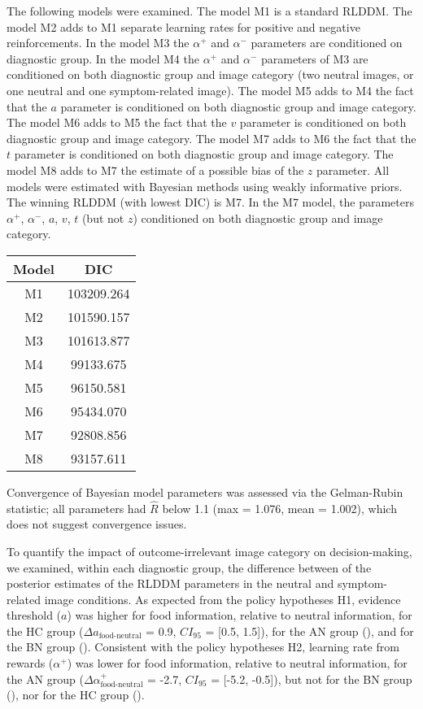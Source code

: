 \documentclass[
  man,floatsintext]{apa6}
\begin{document}
The following models were examined. The model M1 is a standard RLDDM. The model M2 adds to M1 separate learning rates for positive and negative reinforcements. In the model M3 the \(\alpha^+\) and \(\alpha^-\) parameters are conditioned on diagnostic group. In the model M4 the \(\alpha^+\) and \(\alpha^-\) parameters of M3 are conditioned on both diagnostic group and image category (two neutral images, or one neutral and one symptom-related image). The model M5 adds to M4 the fact that the \(a\) parameter is conditioned on both diagnostic group and image category. The model M6 adds to M5 the fact that the \(v\) parameter is conditioned on both diagnostic group and image category. The model M7 adds to M6 the fact that the \(t\) parameter is conditioned on both diagnostic group and image category. The model M8 adds to M7 the estimate of a possible bias of the \(z\) parameter. All models were estimated with Bayesian methods using weakly informative priors. The winning RLDDM (with lowest DIC) is M7. In the M7 model, the parameters \(\alpha^+\), \(\alpha^-\), \(a\), \(v\), \(t\) (but not \(z\)) conditioned on both diagnostic group and image category.

\begin{longtable}[]{@{}cc@{}}
\toprule()
Model & DIC \\
\midrule()
\endhead
M1 & 103209.264 \\
M2 & 101590.157 \\
M3 & 101613.877 \\
M4 & 99133.675 \\
M5 & 96150.581 \\
M6 & 95434.070 \\
M7 & 92808.856 \\
M8 & 93157.611 \\
\bottomrule()
\end{longtable}

Convergence of Bayesian model parameters was assessed via the Gelman-Rubin statistic; all parameters had \(\hat{R}\) below 1.1 (max = 1.076, mean = 1.002), which does not suggest convergence issues.

To quantify the impact of outcome-irrelevant image category on decision-making, we examined, within each diagnostic group, the difference between of the posterior estimates of the RLDDM parameters in the neutral and symptom-related image conditions. As expected from the policy hypotheses H1, evidence threshold (\(a\)) was higher for food information, relative to neutral information, for the HC group (\(\Delta a_{\text{food-neutral}}\) = 0.9, \(CI_{95}\) = {[}0.5, 1.5{]}), for the AN group (), and for the BN group (). Consistent with the policy hypotheses H2, learning rate from rewards (\(\alpha^+\)) was lower for food information, relative to neutral information, for the AN group (\(\Delta \alpha^+_{\text{food-neutral}}\) = -2.7, \(CI_{95}\) = {[}-5.2, -0.5{]}), but not for the BN group (), nor for the HC group ().
\end{document}
